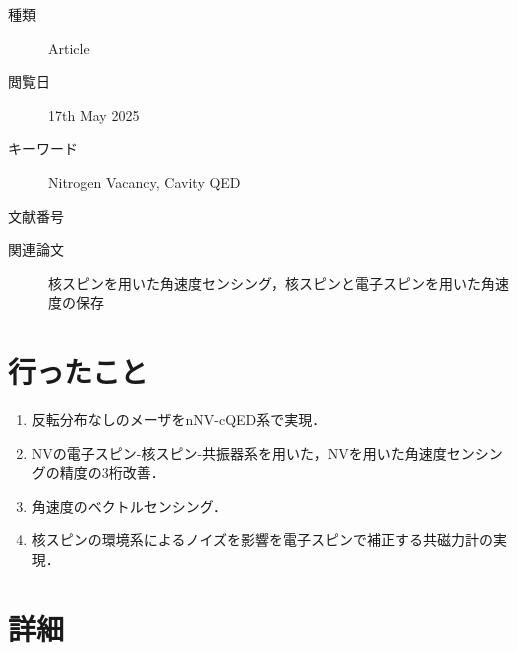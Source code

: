 \begin{boxnote}
      \begin{description}
        \item[種類] Article
        \item[閲覧日] 17th May 2025
        \item[キーワード] Nitrogen Vacancy, Cavity QED
        \item[文献番号] \cite{PhysRevLett.134.183603}
        \item[関連論文] 核スピンを用いた角速度センシング\cite{PhysRevA.86.062104}，核スピンと電子スピンを用いた角速度の保存\cite{wang2024spin}
      \end{description}
    \end{boxnote}
    \section{行ったこと}
      \begin{enumerate}
        \item 反転分布なしのメーザをnNV-cQED系で実現．
        \item NVの電子スピン-核スピン-共振器系を用いた，NVを用いた角速度センシングの精度の3桁改善．
        \item 角速度のベクトルセンシング．
        \item 核スピンの環境系によるノイズを影響を電子スピンで補正する共磁力計の実現．
      \end{enumerate}
    \section{詳細}
